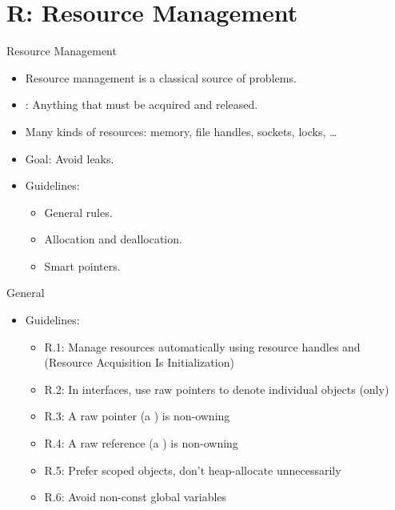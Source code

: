 \section{R: Resource Management}

\begin{frame}[t]{Resource Management}
\begin{itemize}
  \item Resource management is a classical source of problems.
  \item {}: Anything that must be acquired and released.
  \item Many kinds of resources: memory, file handles, sockets, locks, \ldots
  \item Goal: Avoid leaks.

  \item Guidelines:
    \begin{itemize}
      \item General rules.
      \item Allocation and deallocation.
      \item Smart pointers.
    \end{itemize}
\end{itemize}
\end{frame}

\begin{frame}[t]{General}
\begin{itemize}
  \item Guidelines:
    \begin{itemize}
      \item R.1: Manage resources automatically using resource handles and 
             (Resource Acquisition Is Initialization)
      \item R.2: In interfaces, use raw pointers to denote individual objects (only)
      \item R.3: A raw pointer (a ) is non-owning
      \item R.4: A raw reference (a ) is non-owning
      \item R.5: Prefer scoped objects, don’t heap-allocate unnecessarily
      \item R.6: Avoid non-const global variables
    \end{itemize}
\end{itemize}
\end{frame}


